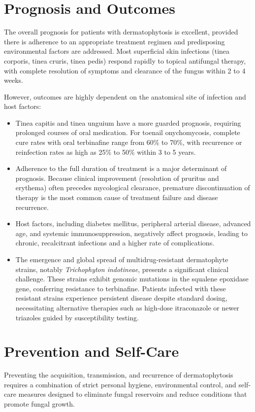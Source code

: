 \section*{Prognosis and Outcomes}
The overall prognosis for patients with dermatophytosis is excellent, provided there is adherence to an appropriate treatment regimen and predisposing environmental factors are addressed. Most superficial skin infections (tinea corporis, tinea cruris, tinea pedis) respond rapidly to topical antifungal therapy, with complete resolution of symptoms and clearance of the fungus within 2 to 4 weeks.

However, outcomes are highly dependent on the anatomical site of infection and host factors:
\begin{itemize}
    \item Tinea capitis and tinea unguium have a more guarded prognosis, requiring prolonged courses of oral medication. For toenail onychomycosis, complete cure rates with oral terbinafine range from 60\% to 70\%, with recurrence or reinfection rates as high as 25\% to 50\% within 3 to 5 years.
    \item Adherence to the full duration of treatment is a major determinant of prognosis. Because clinical improvement (resolution of pruritus and erythema) often precedes mycological clearance, premature discontinuation of therapy is the most common cause of treatment failure and disease recurrence.
    \item Host factors, including diabetes mellitus, peripheral arterial disease, advanced age, and systemic immunosuppression, negatively affect prognosis, leading to chronic, recalcitrant infections and a higher rate of complications.
    \item The emergence and global spread of multidrug-resistant dermatophyte strains, notably \textit{Trichophyton indotineae}, presents a significant clinical challenge. These strains exhibit genomic mutations in the squalene epoxidase gene, conferring resistance to terbinafine. Patients infected with these resistant strains experience persistent disease despite standard dosing, necessitating alternative therapies such as high-dose itraconazole or newer triazoles guided by susceptibility testing.
\end{itemize}

\section*{Prevention and Self-Care}
Preventing the acquisition, transmission, and recurrence of dermatophytosis requires a combination of strict personal hygiene, environmental control, and self-care measures designed to eliminate fungal reservoirs and reduce conditions that promote fungal growth.

